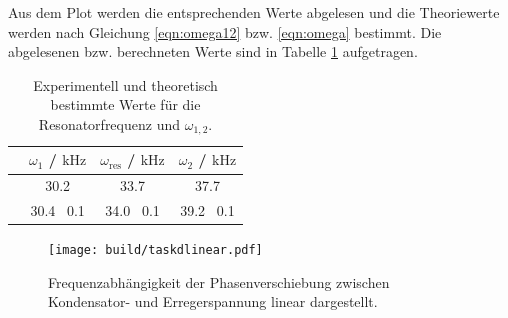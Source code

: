 Aus dem Plot werden die entsprechenden Werte abgelesen und die Theoriewerte werden nach Gleichung \eqref{eqn:omega12} bzw. \eqref{eqn:omega} bestimmt.
Die abgelesenen bzw. berechneten Werte sind in Tabelle \ref{tab:senseless_table} aufgetragen.
\begin{table}
	\caption{Experimentell und theoretisch bestimmte Werte für die Resonatorfrequenz und $\omega_{1,2}$.}
	\centering
	\label{tab:senseless_table}
	\begin{tabular}{cccc}
		\toprule
		                   & $\omega_1$ / $\si{\kilo\hertz}$ & $\omega_{\mathrm{res}}$ / $\si{\kilo\hertz}$ & $\omega_2$ / $\si{\kilo\hertz}$ \\
		\midrule
		\text{Abgelesen}   & 30.2                            & 33.7                                         & 37.7                            \\
		\text{Theoriewert} & 30.4 \pm \, 0.1                    & 34.0 \pm \, 0.1                                 & 39.2 \pm \, 0.1                    \\
		\bottomrule
	\end{tabular}
\end{table}
\begin{figure}
	\centering
	\texttt{[image: build/taskdlinear.pdf]}
	\caption{Frequenzabhängigkeit der Phasenverschiebung zwischen Kondensator- und Erregerspannung linear dargestellt.}
	\label{fig:phasenplotlinear}
\end{figure}

